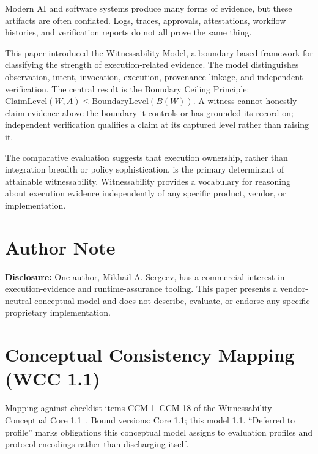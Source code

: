 \documentclass[11pt]{article}
\begin{document}
Modern AI and software systems produce many forms of evidence, but these artifacts are often conflated. Logs, traces, approvals, attestations, workflow histories, and verification reports do not all prove the same thing.

This paper introduced the Witnessability Model, a boundary-based framework for classifying the strength of execution-related evidence. The model distinguishes observation, intent, invocation, execution, provenance linkage, and independent verification. The central result is the Boundary Ceiling Principle: $\mathrm{ClaimLevel}(W,A) \leq \mathrm{BoundaryLevel}(B(W))$. A witness cannot honestly claim evidence above the boundary it controls or has grounded its record on; independent verification qualifies a claim at its captured level rather than raising it.

The comparative evaluation suggests that execution ownership, rather than integration breadth or policy sophistication, is the primary determinant of attainable witnessability. Witnessability provides a vocabulary for reasoning about execution evidence independently of any specific product, vendor, or implementation.

\section*{Author Note}

\noindent\textbf{Disclosure:} One author, Mikhail A. Sergeev, has a commercial interest in execution-evidence and runtime-assurance tooling. This paper presents a vendor-neutral conceptual model and does not describe, evaluate, or endorse any specific proprietary implementation.

\appendix
\section{Conceptual Consistency Mapping (WCC 1.1)}
\label{app:ccm}

Mapping against checklist items CCM-1--CCM-18 of the Witnessability Conceptual Core 1.1~\cite{wcc_core_2026}. Bound versions: Core 1.1; this model 1.1. ``Deferred to profile'' marks obligations this conceptual model assigns to evaluation profiles and protocol encodings rather than discharging itself.
\end{document}

